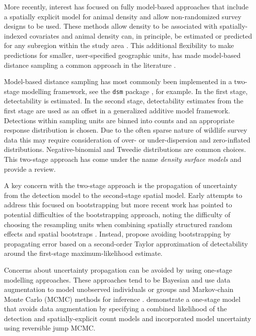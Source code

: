 \documentclass[preprint,12pt]{elsarticle}
\begin{document}
More recently, interest has focused on fully model-based approaches that include a spatially explicit model for animal density and allow non-randomized survey designs to be used.  These methods allow density to be associated with spatially-indexed covariates and animal density can, in principle, be estimated or predicted for any subregion within the study area \citep{johnson_model-based_2010, miller_spatial_2013, buckland_model-based_2016}.  This additional flexibility to make predictions for smaller, user-specified geographic units, has made model-based distance sampling a common approach in the literature \citep{garciabaron_modelling_2019, herr_aerial_2019, breen_new_2017, williams_chilean_2011, stokes_monitoring_2010, williams_modeling_2006}.

Model-based distance sampling has most commonly been implemented in a two-stage modelling framework, see the \texttt{dsm} package \citep{miller_spatial_2013}, for example.  In the first stage, detectability is estimated.  In the second stage, detectability estimates from the first stage are used as an offset in a generalized additive model framework.  Detections within sampling units are binned into counts and an appropriate response distribution is chosen.  Due to the often sparse nature of wildlife survey data this may require consideration of over- or under-dispersion and zero-inflated distributions.  Negative-binomial and Tweedie distributions are common choices.  This two-stage approach has come under the name \textit{density surface models} and \cite{miller_spatial_2013} provide a review.

A key concern with the two-stage approach is the propagation of uncertainty from the detection model to the second-stage spatial model.  Early attempts to address this focused on bootstrapping \citep{lahiri_resampling_2003, hedley_spatial_2004} but more recent work has pointed to potential difficulties of the bootstrapping approach, noting the difficulty of choosing the resampling units when combining spatially structured random effects and spatial bootstraps \citep{bravington_reliable_2018-1, williams_chilean_2011}. Instead, \cite{bravington_reliable_2018-1} propose avoiding bootstrapping by propagating error based on a second-order Taylor approximation of detectability around the first-stage maximum-likelihood estimate.

Concerns about uncertainty propagation can be avoided by using one-stage modelling approaches.  These approaches tend to be Bayesian and use data augmentation to model unobserved individuals or groups and Markov-chain Monte Carlo (MCMC) methods for inference \citep{royle_hierarchical_2008, schmidt_using_2012}.  \citet{oedekoven_bayesian_2014} demonstrate a one-stage model that avoids data augmentation by specifying a combined likelihood of the detection and spatially-explicit count models and incorporated model uncertainty using reversible jump MCMC.  
\end{document}
